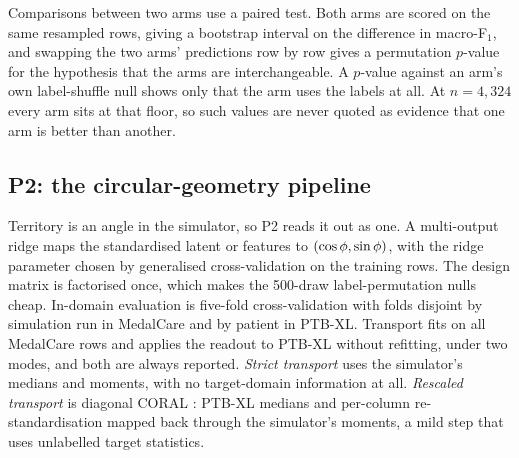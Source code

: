 Comparisons between two arms use a paired test. Both arms are scored on the same resampled rows, giving a bootstrap interval on the difference in macro-F$_1$, and swapping the two arms' predictions row by row gives a permutation $p$-value for the hypothesis that the arms are interchangeable. A $p$-value against an arm's own label-shuffle null shows only that the arm uses the labels at all. At $n=4{,}324$ every arm sits at that floor, so such values are never quoted as evidence that one arm is better than another. 

\subsection{P2: the circular-geometry pipeline}
\label{sec:p2}
Territory is an angle in the simulator, so P2 reads it out as one. A multi-output ridge maps the standardised latent or features to $(\cos\phi, \sin\phi)$, with the ridge parameter chosen by generalised cross-validation on the training rows. The design matrix is factorised once, which makes the 500-draw label-permutation nulls cheap. In-domain evaluation is five-fold cross-validation with folds disjoint by simulation run in MedalCare and by patient in PTB-XL. Transport fits on all MedalCare rows and applies the readout to PTB-XL without refitting, under two modes, and both are always reported. \emph{Strict transport} uses the simulator's medians and moments, with no target-domain information at all. \emph{Rescaled transport} is diagonal CORAL \citep{sun2016coral}: PTB-XL medians and per-column re-standardisation mapped back through the simulator's moments, a mild step that uses unlabelled target statistics. 

